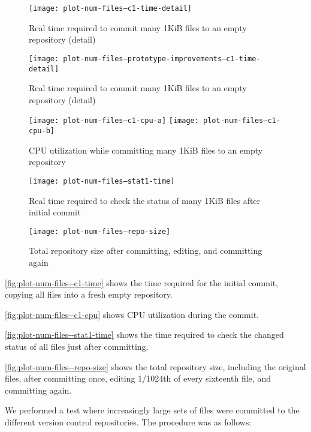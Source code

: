\begin{figure}[p]
  \caption{Real time required to commit many 1KiB files to an empty repository
  (detail)}
  \label{fig:plot-num-files--c1-time-detail}
  \centering
    \texttt{[image: plot-num-files--c1-time-detail]}
\end{figure}

\begin{figure}[p]
  \caption{Real time required to commit many 1KiB files to an empty repository
  (detail)}
  \label{fig:plot-num-files--prototype-improvements--c1-time-detail}
  \centering
    \texttt{[image: plot-num-files--prototype-improvements--c1-time-detail]}
\end{figure}

\begin{figure}[p]
  \caption{CPU utilization while committing many 1KiB files to an empty
  repository}
  \label{fig:plot-num-files--c1-cpu}
  \centering
    \texttt{[image: plot-num-files--c1-cpu-a]}
    \texttt{[image: plot-num-files--c1-cpu-b]}
\end{figure}

\begin{figure}[p]
  \caption{Real time required to check the status of many 1KiB files after
  initial commit}
  \label{fig:plot-num-files--stat1-time}
  \centering
    \texttt{[image: plot-num-files--stat1-time]}
\end{figure}

\begin{figure}[p]
  \caption{Total repository size after committing, editing, and committing again}
  \label{fig:plot-num-files--repo-size}
  \centering
    \texttt{[image: plot-num-files--repo-size]}
\end{figure}

\autoref{fig:plot-num-files--c1-time} shows the time
required for the initial commit, copying all files into a fresh empty
repository.

\autoref{fig:plot-num-files--c1-cpu} shows CPU utilization
during the commit.

\autoref{fig:plot-num-files--stat1-time} shows the time
required to check the changed status of all files just after committing.

\autoref{fig:plot-num-files--repo-size} shows the total
repository size, including the original files, after committing once, editing
1/1024th of every sixteenth file, and committing again.


\iffalse

We performed a test where increasingly large sets of files were committed to the
different version control repositories. The procedure was as follows:

